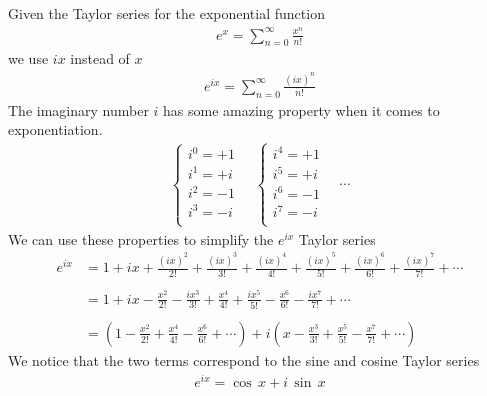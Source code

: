 \documentclass{article}
\begin{document}
Given the Taylor series for the exponential function
\begin{align*}
	e^x=\sum_{n=0}^{\infty}\frac{x^n}{n!}
\end{align*}
we use \(ix\) instead of \(x\)
\begin{align*}
	e^{ix}=\sum_{n=0}^{\infty}\frac{(ix)^n}{n!}
\end{align*}
The imaginary number \(i\) has some amazing property when it comes to exponentiation.
\begin{align*}
	\begin{cases}
		i^0=+1\\
		i^1=+i\\
		i^2=-1\\
		i^3=-i\\
	\end{cases}
	\quad
	\begin{cases}
		i^4=+1\\
		i^5=+i\\
		i^6=-1\\
		i^7=-i\\
	\end{cases}
	\quad
	\cdots
\end{align*}
We can use these properties to simplify the \(e^{ix}\) Taylor series
\begin{align*}
	e^{ix}
	&   =1
		+ix
		+\frac{(ix)^2}{2!}
		+\frac{(ix)^3}{3!}
		+\frac{(ix)^4}{4!}
		+\frac{(ix)^5}{5!}
		+\frac{(ix)^6}{6!}
		+\frac{(ix)^7}{7!}
		+\cdots
	\\
	\\
	&   =1
		+ix
		-\frac{x^2}{2!}
		-\frac{ix^3}{3!}
		+\frac{x^4}{4!}
		+\frac{ix^5}{5!}
		-\frac{x^6}{6!}
		-\frac{ix^7}{7!}
		+\cdots
	\\
	\\
	&=
	\left(
		1
		-\frac{x^2}{2!}
		+\frac{x^4}{4!}
		-\frac{x^6}{6!}
		+\cdots
	\right)
	+i
	\left(
		x
		-\frac{x^3}{3!}
		+\frac{x^5}{5!}
		-\frac{x^7}{7!}
		+\cdots
	\right)
\end{align*}
We notice that the two terms correspond to the sine and cosine Taylor series
\begin{align*}
	e^{ix}=\cos\,x+i\,\sin\,x
\end{align*}
\end{document}
